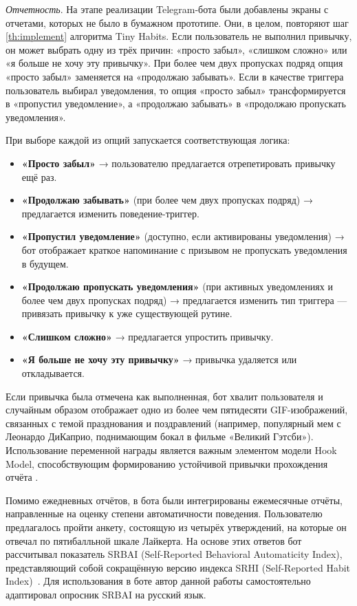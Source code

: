 \documentclass[pdflatex,sn-mathphys-num]{sn-jnl}%
\theoremstyle{thmstyleone}%
\theoremstyle{thmstyletwo}%
\theoremstyle{thmstylethree}%
\begin{document}
\textit{Отчетность}. На этапе реализации Telegram-бота были добавлены экраны с отчетами, которых не было в бумажном прототипе. Они, в целом, повторяют шаг \ref{th:implement} алгоритма Tiny Habits. Если пользователь не выполнил привычку, он может выбрать одну из трёх причин: «просто забыл», «слишком сложно» или «я больше не хочу эту привычку». При более чем двух пропусках подряд опция «просто забыл» заменяется на «продолжаю забывать». Если в качестве триггера пользователь выбирал уведомления, то опция «просто забыл» трансформируется в «пропустил уведомление», а «продолжаю забывать» в «продолжаю пропускать уведомления».

При выборе каждой из опций запускается соответствующая логика:

\begin{itemize}
    \item \textbf{«Просто забыл»} → пользователю предлагается отрепетировать привычку ещё раз.
    \item \textbf{«Продолжаю забывать»} (при более чем двух пропусках подряд) → предлагается изменить поведение-триггер.
    \item \textbf{«Пропустил уведомление»} (доступно, если активированы уведомления) → бот отображает краткое напоминание с призывом не пропускать уведомления в будущем.
    \item \textbf{«Продолжаю пропускать уведомления»} (при активных уведомлениях и более чем двух пропусках подряд) → предлагается изменить тип триггера — привязать привычку к уже существующей рутине.
    \item \textbf{«Слишком сложно»} → предлагается упростить привычку.
    \item \textbf{«Я больше не хочу эту привычку»} → привычка удаляется или откладывается.
\end{itemize}

Если привычка была отмечена как выполненная, бот хвалит пользователя и случайным образом отображает одно из более чем пятидесяти GIF-изображений, связанных с темой празднования и поздравлений (например, популярный мем с Леонардо ДиКаприо, поднимающим бокал в фильме «Великий Гэтсби»). Использование переменной награды является важным элементом модели Hook Model, способствующим формированию устойчивой привычки прохождения отчёта \cite{eyal_hooked_2014}.

Помимо ежедневных отчётов, в бота были интегрированы ежемесячные отчёты, направленные на оценку степени автоматичности поведения. Пользователю предлагалось пройти анкету, состоящую из четырёх утверждений, на которые он отвечал по пятибалльной шкале Лайкерта. На основе этих ответов бот рассчитывал показатель SRBAI (Self-Reported Behavioral Automaticity Index), представляющий собой сокращённую версию индекса SRHI (Self-Reported Habit Index)~\cite{gardner_towards_2012}. Для использования в боте автор данной работы самостоятельно адаптировал опросник SRBAI на русский язык.
\end{document}
